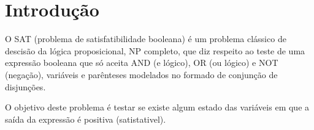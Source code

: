 \section{Introdução}
\label{sec:introducao}

O SAT (problema de satisfatibilidade booleana) é um problema clássico de descisão da lógica proposicional, NP completo, que diz respeito ao teste de uma expressão booleana que só aceita AND (e lógico), OR (ou lógico) e NOT (negação), variáveis e parênteses modelados no formado de conjunção de disjunções.

O objetivo deste problema é testar se existe algum estado das variáveis em que a saída da expressão é positiva (satistativel).


